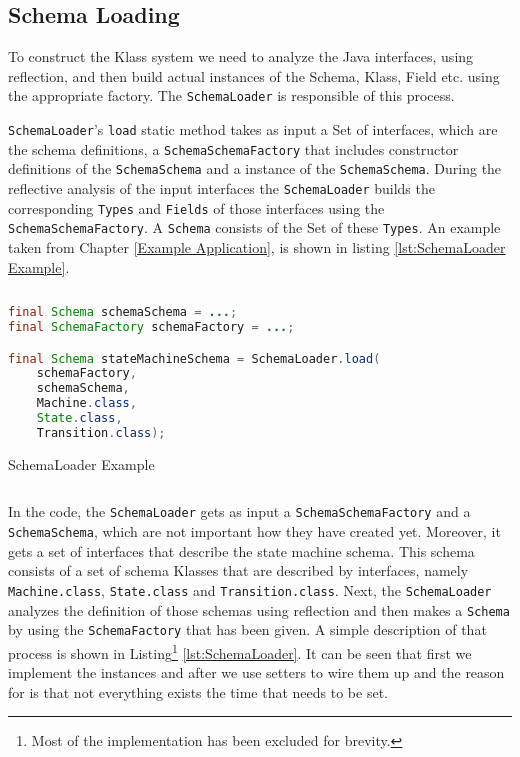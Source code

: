 \subsection{Schema Loading}\label{sec:Schema Loading}
To construct the Klass system we need to analyze the Java interfaces, using reflection, and then build actual instances of the Schema, Klass, Field etc. using the appropriate factory.
The \texttt{SchemaLoader} is responsible of this process.

\texttt{SchemaLoader}'s \texttt{load} static method takes as input a Set of interfaces, which are the schema definitions, a \texttt{SchemaSchemaFactory} that includes constructor definitions of the \texttt{SchemaSchema} and a instance of the \texttt{SchemaSchema}.
During the reflective analysis of the input interfaces the \texttt{SchemaLoader} builds the corresponding \texttt{Types} and \texttt{Fields} of those interfaces using the \texttt{SchemaSchemaFactory}.
A \texttt{Schema} consists of the Set of these \texttt{Types}.
An example taken from Chapter \ref{Example Application}, is shown in listing \ref{lst:SchemaLoader Example}.

\begin{sourcecode} [H]
	\begin{lstlisting}[language=Java, escapechar=|]
final Schema schemaSchema = ...;
final SchemaFactory schemaFactory = ...;

final Schema stateMachineSchema = SchemaLoader.load(
	schemaFactory, 
	schemaSchema, 
	Machine.class, 
	State.class, 
	Transition.class);
	\end{lstlisting}
	\caption{SchemaLoader Example}
	\label{lst:SchemaLoader Example}
\end{sourcecode}

In the code, the \texttt{SchemaLoader} gets as input a \texttt{SchemaSchemaFactory} and a \texttt{SchemaSchema}, which are not important how they have created yet.
Moreover, it gets a set of interfaces that describe the state machine schema.
This schema consists of a set of schema Klasses that are described by interfaces, namely \texttt{Machine.class}, \texttt{State.class} and \texttt{Transition.class}.
Next, the \texttt{SchemaLoader} analyzes the definition of those schemas using reflection and then makes a \texttt{Schema} by using the \texttt{SchemaFactory} that has been given.
A simple description of that process is shown in Listing\footnote{
	Most of the implementation has been excluded for brevity.} \ref{lst:SchemaLoader}.
It can be seen that first we implement the instances and after we use setters to wire them up and the reason for is that not everything exists the time that needs to be set.

